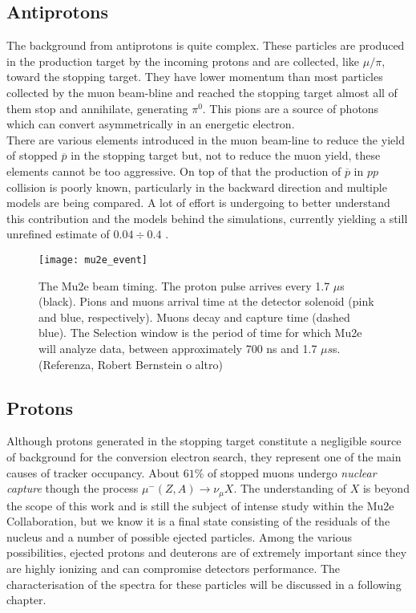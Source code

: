 \documentclass[12pt,a4paper,openright, oneside, titlepage]{book} %
\begin{document}
\subsection{Antiprotons}
The background from antiprotons is quite complex. These particles are produced in the production target by the incoming protons and are collected, like $\mu/\pi$, toward the stopping target. They have lower momentum than most particles collected by the muon beam-bline and reached the stopping target almost all of them stop and annihilate, generating $\pi^0$. This pions are a source of photons which can convert asymmetrically in an energetic electron.\\
There are various elements introduced in the muon beam-line to reduce the yield of stopped $\overline{p}$ in the stopping target but, not to reduce the muon yield, these elements cannot be too aggressive. On top of that the production of $\overline{p}$ in $pp$ collision is poorly known, particularly in the backward direction and multiple models are being compared.
A lot of effort is undergoing to better understand this contribution and the models behind the simulations, currently yielding a still unrefined estimate of $0.04 \div 0.4$ \cite{Giovanni:2020}.
\begin{figure}[h!]
\centering
\texttt{[image: mu2e\_event]}
\caption{The Mu2e beam timing. 
The proton pulse arrives every 1.7 $\mu$s (black). 
Pions and muons arrival time at the detector solenoid (pink and blue, respectively).
Muons decay and capture time (dashed blue).
The Selection window is the period of time for which Mu2e will analyze data,
between approximately 700 ns and 1.7 $\mu s$s. (Referenza, Robert Bernstein o altro)}
\label{_mu2e_event}
\end{figure}

\subsection{Protons}
\label{backgrounds}
Although protons generated in the stopping target constitute a negligible source of background 
for the conversion electron search, they represent one of the main causes of tracker occupancy.  
About $61\%$ of stopped muons undergo \textit{nuclear capture} though the process $\mu^-(Z,A)\rightarrow \nu_\mu X$. 
The understanding of $X$ is beyond the scope of this work and is still the subject of intense study 
within the Mu2e Collaboration, but we know
it is a final state consisting of the residuals of the nucleus and a number of possible ejected particles. 
Among the various possibilities, ejected protons and deuterons are of extremely important since 
they are highly ionizing and can compromise detectors performance. 
The characterisation of the spectra for these particles will be discussed in a following chapter.\\
\end{document}

